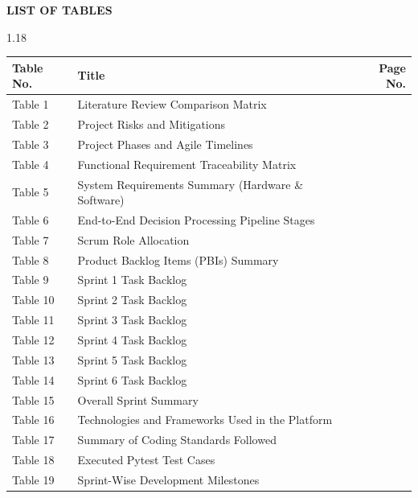 \documentclass[12pt,a4paper]{article}
\begin{document}
\vspace*{0.2in}
\begin{center}{\large\bfseries LIST OF TABLES}\end{center}
\vspace{0.1in}
\begin{spacing}{1.18}
\small
\noindent\begin{tabular}{p{2cm}p{10.5cm}r}
\textbf{Table No.} & \textbf{Title} & \textbf{Page No.}\\ \hline
Table 1 & Literature Review Comparison Matrix & \pageref{tab:comparison_matrix}\\
Table 2 & Project Risks and Mitigations & \pageref{tab:risks_mitigations}\\
Table 3 & Project Phases and Agile Timelines & \pageref{tab:phases_timelines}\\
Table 4 & Functional Requirement Traceability Matrix & \pageref{tab:traceability_matrix}\\
Table 5 & System Requirements Summary (Hardware \& Software) & \pageref{tab:system_requirements}\\
Table 6 & End-to-End Decision Processing Pipeline Stages & \pageref{tab:pipeline_stages}\\
Table 7 & Scrum Role Allocation & \pageref{tab:scrum_allocation}\\
Table 8 & Product Backlog Items (PBIs) Summary & \pageref{tab:pbi_summary}\\
Table 9 & Sprint 1 Task Backlog & \pageref{tab:sprint1_backlog}\\
Table 10 & Sprint 2 Task Backlog & \pageref{tab:sprint2_backlog}\\
Table 11 & Sprint 3 Task Backlog & \pageref{tab:sprint3_backlog}\\
Table 12 & Sprint 4 Task Backlog & \pageref{tab:sprint4_backlog}\\
Table 13 & Sprint 5 Task Backlog & \pageref{tab:sprint5_backlog}\\
Table 14 & Sprint 6 Task Backlog & \pageref{tab:sprint6_backlog}\\
Table 15 & Overall Sprint Summary & \pageref{tab:overall_sprint_summary}\\
Table 16 & Technologies and Frameworks Used in the Platform & \pageref{tab:tech_stack}\\
Table 17 & Summary of Coding Standards Followed & \pageref{tab:coding_standards}\\
Table 18 & Executed Pytest Test Cases & \pageref{tab:test_cases}\\
Table 19 & Sprint-Wise Development Milestones & \pageref{tab:sprint_milestones}\\
\end{tabular}
\end{spacing}
\newpage
\end{document}
